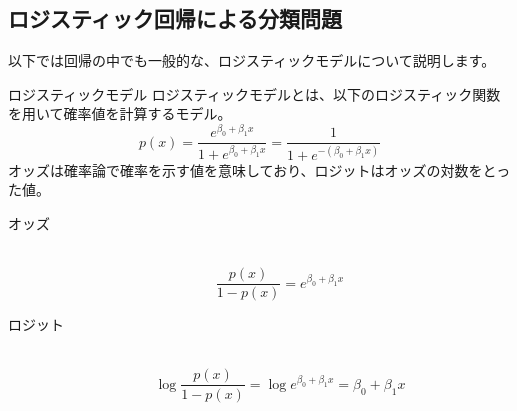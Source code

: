 \documentclass[uplatex]{jsarticle}
\begin{document}
\subsection{ロジスティック回帰による分類問題}
以下では回帰の中でも一般的な、ロジスティックモデルについて説明します。
\begin{itembox}[l]{ロジスティックモデル}
  ロジスティックモデルとは、以下のロジスティック関数を用いて確率値を計算するモデル。
  $$p(x) = \frac{e^{\beta_0 + \beta_1x}}{1 + e^{\beta_0 + \beta_1x}} = \frac{1}{1 + e^{-(\beta_0 + \beta_1x)}}$$
  オッズは確率論で確率を示す値を意味しており、ロジットはオッズの対数をとった値。
  \begin{description}
    \item[オッズ]\mbox{}\\
    $$\frac{p(x)}{1 - p(x)} = e^{\beta_0 + \beta_1 x}$$
    \item[ロジット]\mbox{}\\
    $$\log{\frac{p(x)}{1 - p(x)}} = \log{e^{\beta_0 + \beta_1 x}} = \beta_0 + \beta_1 x$$
  \end{description}
\end{itembox}
\end{document}
